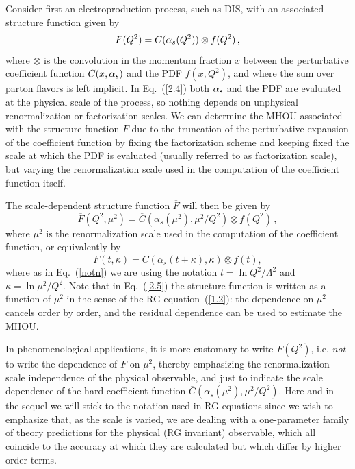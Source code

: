Consider first an electroproduction process, such as DIS, with an associated structure function given by
%
\begin{equation} 
    {F}(Q^2) = {C}(\alpha_s(Q^2))\otimes f(Q^2) \, ,
\label{2.4}
\end{equation}
%
where $\otimes$ is the convolution in the momentum fraction $x$ between the perturbative
coefficient function $C(x,\alpha_s)$ and the PDF $f(x,Q^2)$, and where the sum over parton
flavors is left implicit.
%
In Eq.~(\ref{2.4}) both $\alpha_s$ and the PDF
are evaluated at the physical scale of the process, so nothing depends
on unphysical renormalization or factorization scales.
%
We
can determine the MHOU associated with the structure function $F$ due to the truncation of the
perturbative expansion of the coefficient function by fixing the
factorization scheme and keeping fixed the scale
at which the PDF is evaluated (usually referred to as factorization
scale), but varying the renormalization scale used in the computation
of the coefficient function itself.

The scale-dependent structure function $\overline{F}$ will then be given by
\begin{equation}
    \overline{F}(Q^2, \mu^2) = \overline{C}(\alpha_s(\mu^2), \mu^2/Q^2)\otimes f(Q^2)\, ,
\label{2.5}
\end{equation}
%
where $\mu^2$ is the renormalization scale used in the computation of the coefficient function, or equivalently by 
%
\begin{equation}
    \overline{F}(t, \kappa) = \overline{C}(\alpha_s(t + \kappa), \kappa)\otimes f(t),
\label{2.5a}
\end{equation}
%
where as in Eq.~(\ref{notn}) we are using
the notation $t=\ln Q^2/\Lambda^2$ and $\kappa = \ln \mu^2/Q^2$.
%
Note that in Eq.~(\ref{2.5}) the structure function is written as a
function of $\mu^2$ in the sense of the RG equation~(\ref{1.2}): the
dependence on $\mu^2$ cancels order by order, and the residual
dependence can be used to estimate the MHOU.

In phenomenological applications, it
is more customary to  write $F(Q^2)$, i.e.  {\it not} to write the
dependence of $F$ on $\mu^2$, thereby emphasizing the renormalization
scale independence of the physical observable, and just to indicate
the scale dependence of the hard coefficient function
$\overline{C}(\alpha_s(\mu^2), \mu^2/Q^2)$. Here and in the sequel we
will stick to the  notation used in RG equations
since we wish to emphasize that, as the
scale is varied, we are
dealing with a one-parameter family of theory predictions for the
physical (RG invariant) observable, which all coincide to the accuracy
at which they are calculated but which differ by higher order terms.

